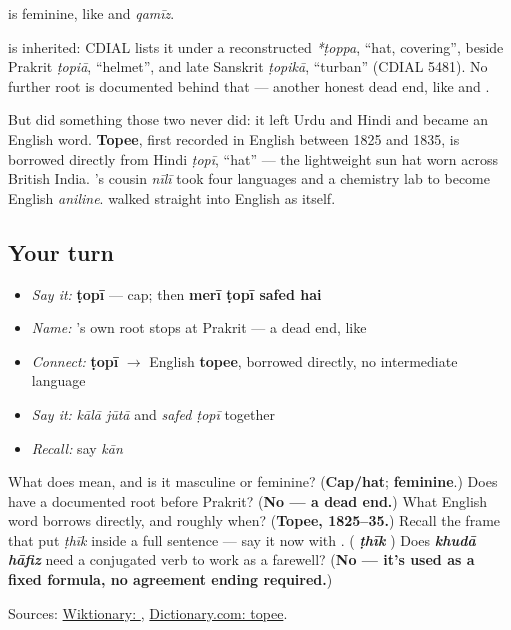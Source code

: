 \textbf{} is feminine, like \textbf{} and \emph{qamīz}.

\begin{cousinweb}
\textbf{} is inherited: CDIAL lists it under a reconstructed \emph{*ṭoppa}, \textquotedblleft{}hat, covering\textquotedblright{}, beside Prakrit \emph{ṭopiā}, \textquotedblleft{}helmet\textquotedblright{}, and late Sanskrit \emph{ṭopikā}, \textquotedblleft{}turban\textquotedblright{} (CDIAL 5481). No further root is documented behind that — another honest dead end, like \textbf{} and \textbf{}.

But \textbf{} did something those two never did: it left Urdu and Hindi and became an English word. \textbf{Topee}, first recorded in English between 1825 and 1835, is borrowed directly from Hindi \emph{ṭopī}, \textquotedblleft{}hat\textquotedblright{} — the lightweight sun hat worn across British India. \textbf{}'s cousin \emph{nīlī} took four languages and a chemistry lab to become English \emph{aniline}. \textbf{} walked straight into English as itself.
\end{cousinweb}

\subsection*{Your turn}
\begin{itemize}
\raggedright
  \item \emph{Say it:} \textbf{ṭopī} — cap; then \textbf{merī ṭopī safed hai}
  \item \emph{Name:} \textbf{}'s own root stops at Prakrit — a dead end, like \textbf{}
  \item \emph{Connect:} \textbf{ṭopī} $\to$ English \textbf{topee}, borrowed directly, no intermediate language
  \item \emph{Say it:} \emph{kālā jūtā} and \emph{safed ṭopī} together
  \item \emph{Recall:} say \emph{kān}
\end{itemize}

\begin{tcolorbox}[breakable,colback=teal!4,colframe=teal!35!black,title={Before you move on}]
What does \textbf{} mean, and is it masculine or feminine? (\textbf{Cap/hat}; \textbf{feminine}.) Does \textbf{} have a documented root before Prakrit? (\textbf{No — a dead end.}) What English word borrows \textbf{} directly, and roughly when? (\textbf{Topee, 1825–35.}) Recall the frame that put \emph{ṭhīk} inside a full sentence — say it now with \textbf{}. (\textbf{ \emph{ṭhīk} }) Does \emph{\textbf{khudā hāfiz}} need a conjugated verb to work as a farewell? (\textbf{No — it's used as a fixed formula, no agreement ending required.})

Sources: \href{https://en.wiktionary.org/wiki/\%D9\%B9\%D9\%88\%D9\%BE\%DB\%8C}{Wiktionary: }, \href{https://www.dictionary.com/browse/topee}{Dictionary.com: topee}.
\end{tcolorbox}
